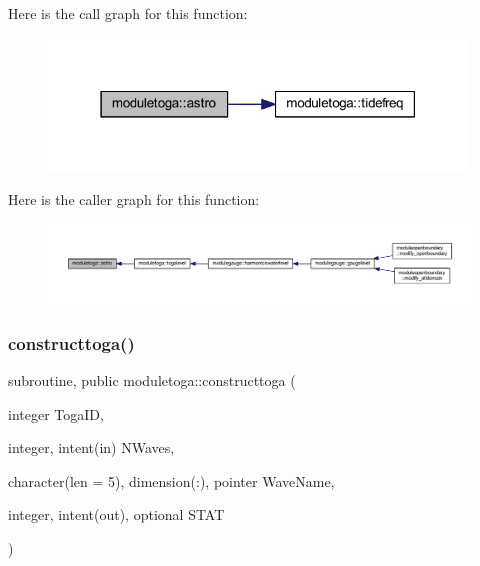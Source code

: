 Here is the call graph for this function\+:\nopagebreak
\begin{figure}[H]
\begin{center}
\leavevmode
\includegraphics[width=315pt]{namespacemoduletoga_ae4a4ae3ca80be3e56570e30a039abd61_cgraph}
\end{center}
\end{figure}
Here is the caller graph for this function\+:\nopagebreak
\begin{figure}[H]
\begin{center}
\leavevmode
\includegraphics[width=350pt]{namespacemoduletoga_ae4a4ae3ca80be3e56570e30a039abd61_icgraph}
\end{center}
\end{figure}
\mbox{\label{namespacemoduletoga_a49f980ff51e54f1045b60179a9ab5226}} 
\subsubsection{\texorpdfstring{constructtoga()}{constructtoga()}}
{\footnotesize\ttfamily subroutine, public moduletoga\+::constructtoga (\begin{DoxyParamCaption}\item[{integer}]{Toga\+ID,  }\item[{integer, intent(in)}]{N\+Waves,  }\item[{character(len = 5), dimension(\+:), pointer}]{Wave\+Name,  }\item[{integer, intent(out), optional}]{S\+T\+AT }\end{DoxyParamCaption})}

